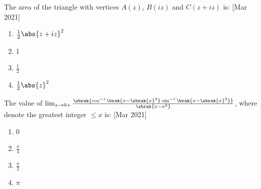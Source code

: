  \item The area of the triangle with vertices $A (z)$, $B (iz)$ and $C (z + iz)$ is: \hfill[Mar 2021]
 \begin{enumerate}
     \item $\frac{1}{2}\abs{z+iz}^2$
     \item 1
     \item $\frac{1}{2}$
     \item $\frac{1}{2}\abs{z}^2$\\
 \end{enumerate}
\item The 
   value of $\lim_{x\rightarrow 0+} \frac{\sbrak{\cos^{-1}\brak{x - \sbrak{x}^2}\cdot\sin^{-1}\brak{x - \sbrak{x}^2}}}{\sbrak{x - x^3}}$, where  denote the greatest integer $\leq x$ is: \hfill[Mar 2021]
\begin{enumerate}
    \item 0
    \item $\frac{\pi}{4}$
    \item $\frac{\pi}{2}$
    \item $\pi$\\
\end{enumerate}
